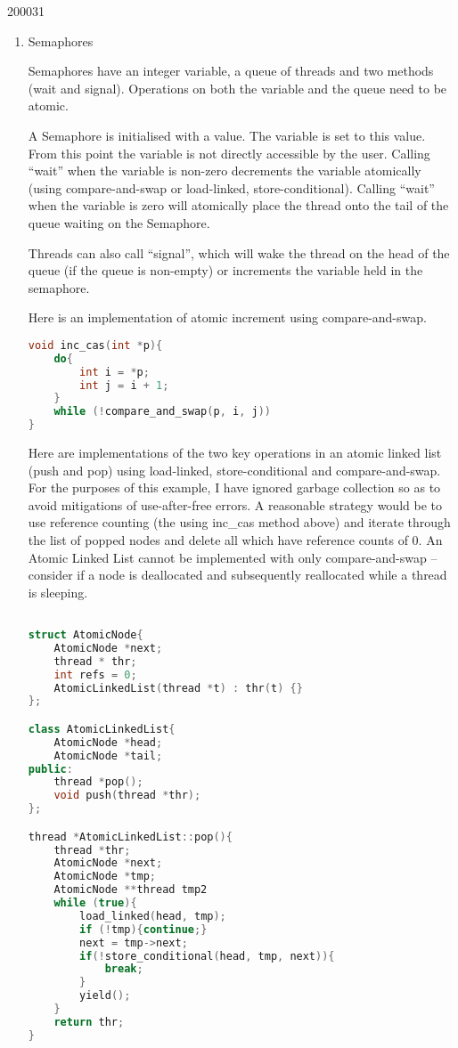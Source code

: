 \documentclass[10pt,\jkfside,a4paper]{article}
\begin{document}
\begin{examquestion}{2000}{3}{1}
\begin{enumerate}[label=(\alph*)]
\begin{enumerate}[label=(\roman*)]
\item Semaphores

Semaphores have an integer variable, a queue of threads and two methods
(wait and signal). Operations on both the variable and the queue need to be
atomic.

A Semaphore is initialised with a value. The variable is set to this value.
From this point the variable is not directly accessible by the user. Calling
``wait'' when the variable is non-zero decrements the variable atomically
(using compare-and-swap or load-linked, store-conditional). Calling ``wait''
when the variable is zero will atomically place the thread onto the tail of
the queue waiting on the Semaphore.

Threads can also call ``signal'', which will wake the thread on the head of
the queue (if the queue is non-empty) or increments the variable held in the
semaphore.

Here is an implementation of atomic increment using compare-and-swap.
\begin{lstlisting}[language=C++]
void inc_cas(int *p){
	do{
		int i = *p;
		int j = i + 1;
	}
	while (!compare_and_swap(p, i, j))
}
\end{lstlisting}

Here are implementations of the two key operations in an atomic linked list
(push and pop) using load-linked, store-conditional and compare-and-swap. For
the purposes of this example, I have ignored garbage collection so as to
avoid mitigations of use-after-free errors. A reasonable strategy would be
to use reference counting (the using inc\_cas method above) and iterate
through the list of popped nodes and delete all which have reference counts
of 0. An Atomic Linked List cannot be implemented with only compare-and-swap
-- consider if a node is deallocated and subsequently reallocated while a
thread is sleeping.

\begin{lstlisting}[language=C++]

struct AtomicNode{
	AtomicNode *next;
	thread * thr;
	int refs = 0;
	AtomicLinkedList(thread *t) : thr(t) {}
};

class AtomicLinkedList{
	AtomicNode *head;
	AtomicNode *tail;
public:
	thread *pop();
	void push(thread *thr);
};

thread *AtomicLinkedList::pop(){
	thread *thr;
	AtomicNode *next;
	AtomicNode *tmp;
	AtomicNode **thread tmp2
	while (true){
		load_linked(head, tmp);
		if (!tmp){continue;}
		next = tmp->next;
		if(!store_conditional(head, tmp, next)){
			break;
		}
		yield();
	}
	return thr;
}


\end{lstlisting}
\end{enumerate}
\end{enumerate}
\end{examquestion}
\end{document}
